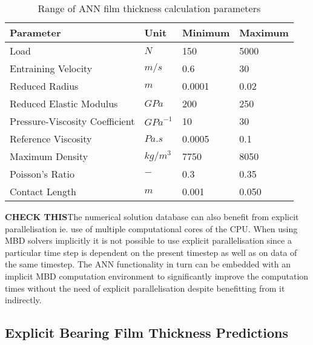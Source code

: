 \begin{table*}
	\caption{Range of ANN film thickness calculation parameters}
	\label{Range of ANN film thickness calculation parameters}
	\centering
	\renewcommand{\arraystretch}{1.5}%
	\begin{tabular}{|P{0.4\textwidth}|P{0.15\textwidth}|P{0.15\textwidth}|P{0.15\textwidth}|}
		\hline
		\textbf{Parameter} & \textbf{Unit} & \textbf{Minimum} & \textbf{Maximum} \\ [0.5ex]
		\hline
		Load & $N$ & 150 & 5000 \\ [0.5ex]
		\hline
		Entraining Velocity & $m/s$ & 0.6 & 30 \\ [0.5ex]
		\hline
		Reduced Radius & $m$ & 0.0001 & 0.02 \\ [0.5ex]
		\hline
		Reduced Elastic Modulus & $GPa$ & 200 & 250 \\ [0.5ex]
		\hline
		Pressure-Viscosity Coefficient & ${GPa}^{-1}$ & 10 & 30 \\ [0.5ex]
		\hline
		Reference Viscosity & $Pa.s$ & 0.0005 & 0.1 \\ [0.5ex]
		\hline
		Maximum Density & ${kg}/{m}^3$ & 7750 & 8050 \\ [0.5ex]
		\hline
		Poisson's Ratio & $-$ & 0.3 & 0.35 \\ [0.5ex]
		\hline
		Contact Length & $m$ & 0.001 & 0.050 \\ [0.5ex]
		\hline
		
	\end{tabular}
\end{table*}

\textbf{CHECK THIS}The numerical solution database can also benefit from explicit parallelisation ie. use of multiple computational cores of the CPU. When using MBD solvers implicitly it is not possible to use explicit parallelisation since a particular time step is dependent on the present timestep as well as on data of the same timestep. The ANN functionality in turn can be embedded with an implicit MBD computation environment to significantly improve the computation times without the need of explicit parallelisation despite benefitting from it indirectly. 








\subsection{Explicit Bearing Film Thickness Predictions}

